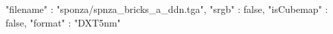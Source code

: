 { 
	"filename" : "sponza/spnza_bricks_a_ddn.tga", 
	"srgb" : false,
	"isCubemap" : false,
	"format" : "DXT5nm"
}